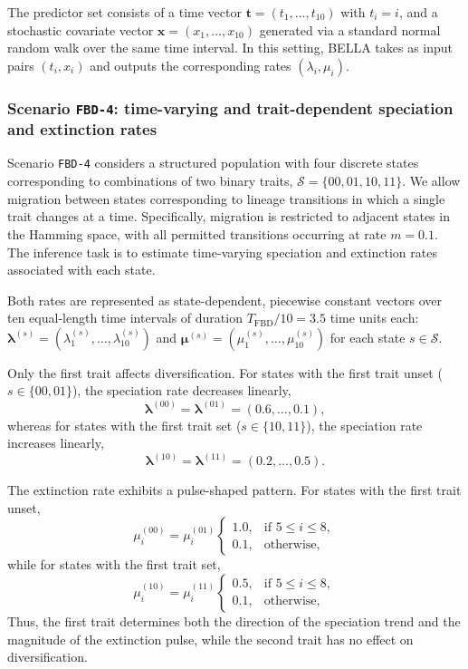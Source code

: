 The predictor set consists of a time vector $\mathbf{t} = (t_1, \dots, t_{10})$ with $t_i = i$, and a stochastic covariate vector $\mathbf{x} = (x_1, \dots, x_{10})$ generated via a standard normal random walk over the same time interval.
In this setting, BELLA takes as input pairs $(t_i, x_i)$ and outputs the corresponding rates $(\lambda_i, \mu_i)$.

\subsubsection{Scenario \texttt{FBD-4}: time-varying and trait-dependent speciation and extinction rates}

Scenario \texttt{FBD-4} considers a structured population with four discrete states corresponding to combinations of two binary traits, $\mathcal{S} = \{00, 01, 10, 11\}$. We allow migration between states corresponding to lineage transitions in which a single trait changes at a time. Specifically, migration is restricted to adjacent states in the Hamming space, with all permitted transitions occurring at rate $m = 0.1$. The inference task is to estimate time-varying speciation and extinction rates associated with each state.

Both rates are represented as state-dependent, piecewise constant vectors over ten equal-length time intervals of duration $T_{\text{FBD}} / 10 = 3.5$ time units each: $\boldsymbol{\lambda}^{(s)} = (\lambda^{(s)}_1, \dots, \lambda^{(s)}_{10})$ and $\boldsymbol{\mu}^{(s)} = (\mu^{(s)}_1, \dots, \mu^{(s)}_{10})$ for each state $s \in \mathcal{S}$.

Only the first trait affects diversification. For states with the first trait unset ($s \in \{00,01\}$), the speciation rate decreases linearly,
\[
\boldsymbol{\lambda}^{(00)} = \boldsymbol{\lambda}^{(01)} = (0.6, \dots, 0.1),
\]
whereas for states with the first trait set ($s \in \{10,11\}$), the speciation rate increases linearly,
\[
\boldsymbol{\lambda}^{(10)} = \boldsymbol{\lambda}^{(11)} = (0.2, \dots, 0.5).
\]

The extinction rate exhibits a pulse-shaped pattern. For states with the first trait unset,
\[
\mu^{(00)}_i = \mu^{(01)}_i
\begin{cases}
1.0, & \text{if } 5 \le i \le 8, \\
0.1, & \text{otherwise},
\end{cases}
\]
while for states with the first trait set,
\[
\mu^{(10)}_i = \mu^{(11)}_i
\begin{cases}
0.5, & \text{if } 5 \le i \le 8, \\
0.1, & \text{otherwise},
\end{cases}
\]
Thus, the first trait determines both the direction of the speciation trend and the magnitude of the extinction pulse, while the second trait has no effect on diversification.

